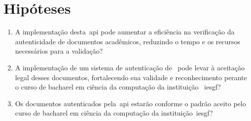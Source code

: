 \section{Hipóteses}\label{sec:hipoteses}

\begin{enumerate}[label=\alph*)]
    \item A implementação desta~\acrshort{api} pode aumentar a eficiência na
    verificação da autenticidade de documentos acadêmicos, reduzindo o tempo e
    os recursos necessários para a validação?
    \item A implementação de um sistema de autenticação de~ pode
    levar à aceitação legal desses documentos, fortalecendo sua validade e
    reconhecimento perante o curso de bacharel em ciência da computação da instituição
    ~\acrshort{iesgf}?
    \item Os documentos autenticados pela~\acrshort{api} estarão conforme o padrão
    aceito pelo curso de bacharel em ciência da computação da instituição~\acrshort{iesgf}?
\end{enumerate}